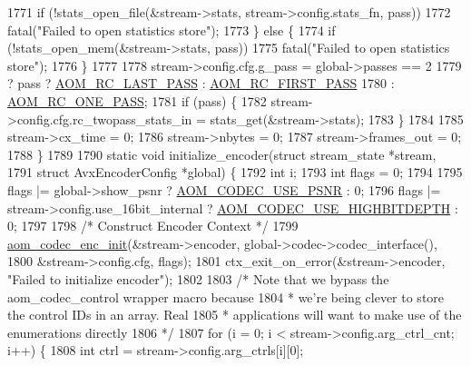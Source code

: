 \begin{DoxyCodeInclude}
{{{{{{{{{{{{{{{{{{{{{{{{{{{{{{{1771     \textcolor{keywordflow}{if} (!stats\_open\_file(&stream->stats, stream->config.stats\_fn, pass))
1772       fatal(\textcolor{stringliteral}{"Failed to open statistics store"});
1773   \} \textcolor{keywordflow}{else} \{
1774     \textcolor{keywordflow}{if} (!stats\_open\_mem(&stream->stats, pass))
1775       fatal(\textcolor{stringliteral}{"Failed to open statistics store"});
1776   \}
1777 
1778   stream->config.cfg.g\_pass = global->passes == 2
1779                                   ? pass ? \hyperlink{group__encoder_gga92b6709b58dc3435e3ba652da562eda1a621c3f07937527618dc06e962425f6cc}{AOM\_RC\_LAST\_PASS} : 
      \hyperlink{group__encoder_gga92b6709b58dc3435e3ba652da562eda1ad342b33a290482c20238bfde5d9bea1e}{AOM\_RC\_FIRST\_PASS}
1780                                   : \hyperlink{group__encoder_gga92b6709b58dc3435e3ba652da562eda1a1b4b8ee9c1910fc59ac9dfd9700f3f02}{AOM\_RC\_ONE\_PASS};
1781   \textcolor{keywordflow}{if} (pass) \{
1782     stream->config.cfg.rc\_twopass\_stats\_in = stats\_get(&stream->stats);
1783   \}
1784 
1785   stream->cx\_time = 0;
1786   stream->nbytes = 0;
1787   stream->frames\_out = 0;
1788 \}
1789 
1790 \textcolor{keyword}{static} \textcolor{keywordtype}{void} initialize\_encoder(\textcolor{keyword}{struct} stream\_state *stream,
1791                                \textcolor{keyword}{struct} AvxEncoderConfig *global) \{
1792   \textcolor{keywordtype}{int} i;
1793   \textcolor{keywordtype}{int} flags = 0;
1794 
1795   flags |= global->show\_psnr ? \hyperlink{group__encoder_gae722c9f9ba9b4ca8dba6bbe7c0692024}{AOM\_CODEC\_USE\_PSNR} : 0;
1796   flags |= stream->config.use\_16bit\_internal ? \hyperlink{group__encoder_gae30bbbdef18e9da3631b69c170533e92}{AOM\_CODEC\_USE\_HIGHBITDEPTH} : 0;
1797 
1798   \textcolor{comment}{/* Construct Encoder Context */}
1799   \hyperlink{group__encoder_gaade68a7d33d30f97dc9a596aa5e065d8}{aom\_codec\_enc\_init}(&stream->encoder, global->codec->codec\_interface(),
1800                      &stream->config.cfg, flags);
1801   ctx\_exit\_on\_error(&stream->encoder, \textcolor{stringliteral}{"Failed to initialize encoder"});
1802 
1803   \textcolor{comment}{/* Note that we bypass the aom\_codec\_control wrapper macro because}
1804 \textcolor{comment}{   * we're being clever to store the control IDs in an array. Real}
1805 \textcolor{comment}{   * applications will want to make use of the enumerations directly}
1806 \textcolor{comment}{   */}
1807   \textcolor{keywordflow}{for} (i = 0; i < stream->config.arg\_ctrl\_cnt; i++) \{
1808     \textcolor{keywordtype}{int} ctrl = stream->config.arg\_ctrls[i][0];
}}}}}}}}}}}}}}}}}}}}}}}}}}}}}}}
\end{DoxyCodeInclude}
